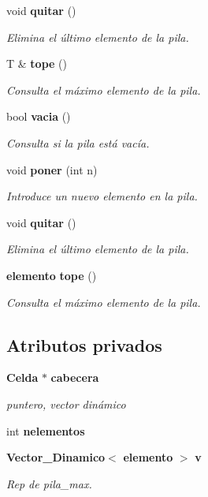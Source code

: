 \begin{DoxyCompactItemize}
void {\bf quitar} ()
\begin{DoxyCompactList}\small\item\em Elimina el último elemento de la pila. \end{DoxyCompactList}\item 
\label{classPila__max_ae8f079d33416918cb785cddc64bab78c} 
T \& {\bf tope} ()
\begin{DoxyCompactList}\small\item\em Consulta el máximo elemento de la pila. \end{DoxyCompactList}\item 
\label{classPila__max_a280f558007b1b064a43a9983a212f682} 
bool {\bf vacia} ()
\begin{DoxyCompactList}\small\item\em Consulta si la pila está vacía. \end{DoxyCompactList}\item 
void {\bf poner} (int n)
\begin{DoxyCompactList}\small\item\em Introduce un nuevo elemento en la pila. \end{DoxyCompactList}\item 
\label{classPila__max_adb91c11d4d02c43d7d58d01be821a589} 
void {\bf quitar} ()
\begin{DoxyCompactList}\small\item\em Elimina el último elemento de la pila. \end{DoxyCompactList}\item 
\label{classPila__max_a499853a0930095ec8212d13ccfe25d4a} 
{\bf elemento} {\bf tope} ()
\begin{DoxyCompactList}\small\item\em Consulta el máximo elemento de la pila. \end{DoxyCompactList}\end{DoxyCompactItemize}
\subsection*{Atributos privados}
\begin{DoxyCompactItemize}
\item 
\label{classPila__max_ac5f4c44440a67449802f882940bb5558} 
{\bf Celda} $\ast$ {\bf cabecera}
\begin{DoxyCompactList}\small\item\em puntero, vector dinámico \end{DoxyCompactList}\item 
\label{classPila__max_a769867173f1706c312fc0311220f5bf0} 
int {\bfseries nelementos}
\item 
{\bf Vector\+\_\+\+Dinamico}$<$ {\bf elemento} $>$ {\bf v}
\begin{DoxyCompactList}\small\item\em Rep de pila\+\_\+max. \end{DoxyCompactList}\end{DoxyCompactItemize}


